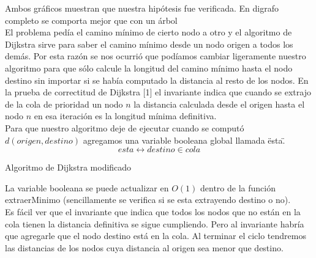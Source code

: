 Ambos gr\'aficos muestran que nuestra hip\'otesis fue verificada. En digrafo completo se comporta mejor que con un \'arbol \\

El problema ped\'ia el camino m\'inimo de cierto nodo a otro y el algoritmo de Dijkstra sirve para saber el camino m\'inimo desde un nodo origen a todos los dem\'as. Por esta raz\'on se nos ocurri\'o que pod\'iamos cambiar ligeramente nuestro algoritmo para que s\'olo calcule la longitud del camino m\'inimo hasta el nodo destino sin importar si se hab\'ia computado la distancia al resto de los nodos. En la prueba de correctitud de Dijkstra [1]
el invariante indica que cuando se extrajo de la cola de prioridad un nodo $n$ la distancia calculada desde el origen hasta el nodo $n$ en esa iteraci\'on es la longitud m\'inima definitiva.\\
Para que nuestro algoritmo deje de ejecutar cuando se comput\'o $d(origen,destino)$ agregamos una variable booleana global llamada \"esta\".\\
\begin{equation*}
    esta \leftrightarrow destino \in cola
\end{equation*}

\begin{algorithm}[H]
	\label{algo: pseudocodigo_ej3_dijsktra}
	\caption{Algoritmo de Dijkstra modificado}
\end{algorithm}

La variable booleana se puede actualizar en $O(1)$ dentro de la funci\'on extraerMinimo (sencillamente se verifica si se esta extrayendo destino o no).\\
Es f\'acil ver que el invariante que indica que todos los nodos que no est\'an en la cola tienen la distancia definitiva se sigue cumpliendo. Pero al invariante habr\'ia que agregarle que el nodo destino est\'a en la cola. Al terminar el ciclo tendremos las distancias de los nodos cuya distancia al origen sea menor que destino. \newpage

